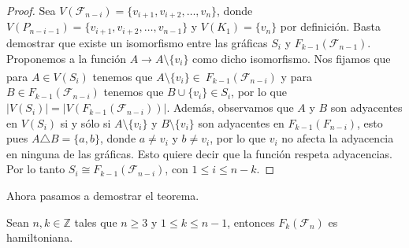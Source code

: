         \begin{proof}
            Sea $V(\mathcal{F}_{n-i}) = \{v_{i+1}, v_{i+2}, \dots, v_n\}$, donde
            $V(P_{n-i-1}) = \{v_{i+1}, v_{i+2}, \dots, v_{n-1}\}$ y $V(K_1)=
            \{v_n\}$ por definici\'on. Basta demostrar que existe un isomorfismo
            entre las gr\'aficas $S_i$ y $F_{k-1}(\mathcal{F}_{n-1})$.
            Proponemos a la funci\'on $A \xrightarrow[]{} A \setminus \{v_i\}$
            como dicho isomorfismo. Nos fijamos que para $A \in
            V(S_i)$ tenemos que $A \setminus \{v_i\} \in \
            F_{k-1}(\mathcal{F}_{n-i})$  y para $B \in
            F_{k-1}(\mathcal{F}_{n-i})$ tenemos que $B \cup \{v_i\} \in S_i$,
            por lo que $|V(S_i)|=|V(F_{k-1}(\mathcal{F}_{n-i}))|$. Adem\'as,
            observamos que $A$ y $B $ son adyacentes en $V(S_i)$ si y s\'olo si
            $A \setminus \{v_i\}$ y $B \setminus \{v_i\}$ son adyacentes en
            $F_{k-1}(F_{n-i})$, esto pues $A\triangle B = \{a,b\}$, donde $a\neq
            v_i$ y $b \neq v_i$, por lo que $v_i$ no afecta la adyacencia en
            ninguna de las gr\'aficas. Esto quiere decir que la funci\'on
            respeta adyacencias. Por lo tanto $S_i \cong
            F_{k-1}(\mathcal{F}_{n-i})$, con $1 \leq i \leq n-k$.
        \end{proof}

        Ahora pasamos a demostrar el teorema.
    
        \begin{teorema}
        \label{teo:hamilt-SFan}
            Sean $n,k \in \mathbb{Z}$ tales que $n \geq 3$ y $1 \leq k \leq n-1$,
            entonces $F_k(\mathcal{F}_n)$ es hamiltoniana.
        \end{teorema}
    
